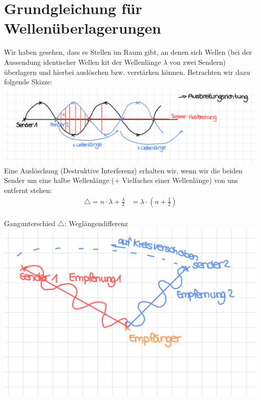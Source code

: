 \documentclass[12pt,a4paper]{report}
\begin{document}
	\setcounter{section}{12}
	\section{Grundgleichung für Wellenüberlagerungen}
	Wir haben \dq gesehen\dq, dass es Stellen im Raum gibt, an denen sich Wellen (bei der Aussendung identischer Wellen kit der Wellenlänge $\lambda$ von zwei Sendern) überlagern und hierbei auslöschen bzw. verstärken können. Betrachten wir dazu folgende Skizze:\\
	\includegraphics[width=\textwidth]{JPEG-Bild-443E-8313-20-0.JPEG}
	Eine Auslöschung (\dq Destruktive Interferenz\dq) erhalten wir, wenn wir die beiden Sender um eine halbe Wellenlänge (+ Vielfaches einer Wellenlänge) von uns entfernt stehen:
	\begin{align*}
		\bigtriangleup =n \cdot \lambda + \frac{\lambda}{2} &= \lambda \cdot (n+\frac{1}{2})
	\end{align*} \\
	Gangunterschied $\bigtriangleup$: \dq Weglängendifferenz\dq \\
	\includegraphics[width=\textwidth]{JPEG-Bild-4CCB-9E90-7A-0.JPEG}
	\newpage
\end{document}
